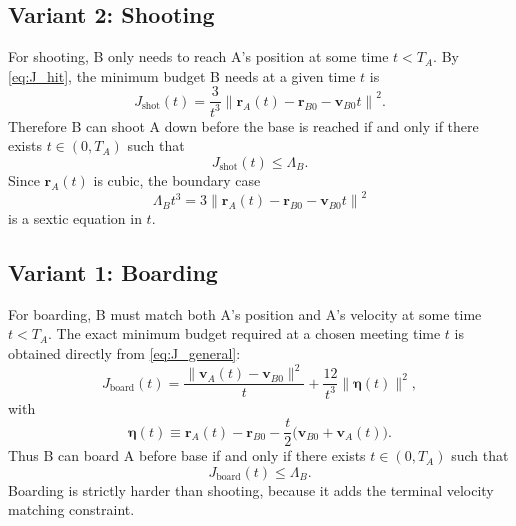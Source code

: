 \documentclass[journal, a4paper]{IEEEtran}
\begin{document}
\subsection{Variant 2: Shooting}
For shooting, B only needs to reach A's position at some time $t<T_A$. By \eqref{eq:J_hit}, the minimum budget B needs at a given time $t$ is
\begin{equation}
J_{\mathrm{shot}}(t)
=\frac{3}{t^3}
\left\|\mathbf r_A(t)-\mathbf r_{B0}-\mathbf v_{B0}t\right\|^2.
\label{eq:J_shot}
\end{equation}
Therefore B can shoot A down before the base is reached if and only if there exists $t\in(0,T_A)$ such that
\begin{equation}
J_{\mathrm{shot}}(t)\le \Lambda_B.
\label{eq:shot_feasible}
\end{equation}
Since $\mathbf r_A(t)$ is cubic, the boundary case
\begin{equation}
\Lambda_B t^3 = 3\left\|\mathbf r_A(t)-\mathbf r_{B0}-\mathbf v_{B0}t\right\|^2
\label{eq:shot_boundary}
\end{equation}
is a sextic equation in $t$.

\subsection{Variant 1: Boarding}
For boarding, B must match both A's position and A's velocity at some time $t<T_A$. The exact minimum budget required at a chosen meeting time $t$ is obtained directly from \eqref{eq:J_general}:
\begin{equation}
J_{\mathrm{board}}(t)=
\frac{\|\mathbf v_A(t)-\mathbf v_{B0}\|^2}{t}
+\frac{12}{t^3}\|\boldsymbol\eta(t)\|^2,
\label{eq:J_board}
\end{equation}
with
\begin{equation}
\boldsymbol\eta(t)\equiv
\mathbf r_A(t)-\mathbf r_{B0}
-\frac{t}{2}\bigl(\mathbf v_{B0}+\mathbf v_A(t)\bigr).
\label{eq:eta_def}
\end{equation}
Thus B can board A before base if and only if there exists $t\in(0,T_A)$ such that
\begin{equation}
J_{\mathrm{board}}(t)\le \Lambda_B.
\label{eq:board_feasible}
\end{equation}
Boarding is strictly harder than shooting, because it adds the terminal velocity matching constraint.
\end{document}
